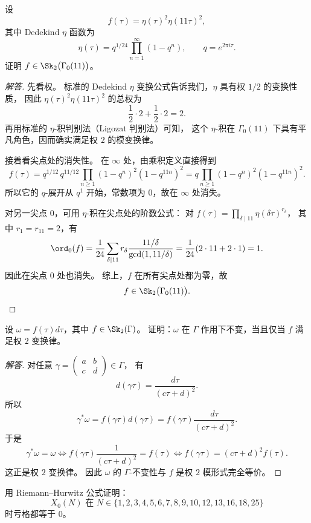 \begin{exercise}
\label{ex:ch02-eta-11}
设
\[
  f(\tau)=\eta(\tau)^2\eta(11\tau)^2,
\]
其中 Dedekind $\eta$ 函数为
\[
  \eta(\tau)=q^{1/24}\prod_{n=1}^{\infty}(1-q^n),
  \qquad q=e^{2\pi i\tau}.
\]
证明 $f\in \Sk_2\bigl(\Gamma_0(11)\bigr)$。
\end{exercise}

\begin{proof}[解答]
先看权。
标准的 Dedekind $\eta$ 变换公式告诉我们，$\eta$ 具有权 $1/2$ 的变换性质，
因此 $\eta(\tau)^2\eta(11\tau)^2$ 的总权为
\[
  \frac12\cdot 2+\frac12\cdot 2=2.
\]
再用标准的 $\eta$-积判别法（Ligozat 判别法）可知，
这个 $\eta$-积在 $\Gamma_0(11)$ 下具有平凡角色，因而确实满足权 $2$ 的模变换律。

接着看尖点处的消失性。
在 $\infty$ 处，由乘积定义直接得到
\[
  f(\tau)=q^{1/12}\,q^{11/12}\prod_{n\ge 1}(1-q^n)^2(1-q^{11n})^2
  =q\prod_{n\ge 1}(1-q^n)^2(1-q^{11n})^2.
\]
所以它的 $q$-展开从 $q^1$ 开始，常数项为 $0$，故在 $\infty$ 处消失。

对另一尖点 $0$，可用 $\eta$-积在尖点处的阶数公式：
对
$f(\tau)=\prod_{\delta\mid 11}\eta(\delta\tau)^{r_\delta}$，
其中 $r_1=r_{11}=2$，有
\[
  \ord_{0}(f)=\frac1{24}\sum_{\delta\mid 11} r_\delta\frac{11/\delta}{\gcd(1,11/\delta)}
  =\frac1{24}(2\cdot 11+2\cdot 1)=1.
\]
因此在尖点 $0$ 处也消失。
综上，$f$ 在所有尖点处都为零，故
\[
  f\in \Sk_2\bigl(\Gamma_0(11)\bigr).
\]
\end{proof}

\begin{exercise}
\label{ex:ch02-weight2-invariance}
设 $\omega=f(\tau)d\tau$，其中 $f\in \Sk_2(\Gamma)$。
证明：$\omega$ 在 $\Gamma$ 作用下不变，当且仅当 $f$ 满足权 $2$ 变换律。
\end{exercise}

\begin{proof}[解答]
对任意
$\gamma=\begin{pmatrix}a&b\\c&d\end{pmatrix}\in\Gamma$，
有
\[
  d(\gamma\tau)=\frac{d\tau}{(c\tau+d)^2}.
\]
所以
\[
  \gamma^*\omega=f(\gamma\tau)d(\gamma\tau)
  =f(\gamma\tau)\frac{d\tau}{(c\tau+d)^2}.
\]
于是
\[
  \gamma^*\omega=\omega
  \iff f(\gamma\tau)\frac{1}{(c\tau+d)^2}=f(\tau)
  \iff f(\gamma\tau)=(c\tau+d)^2f(\tau).
\]
这正是权 $2$ 变换律。
因此 $\omega$ 的 $\Gamma$-不变性与 $f$ 是权 $2$ 模形式完全等价。
\end{proof}

\begin{exercise}
\label{ex:ch02-genus-zero-list}
用 Riemann--Hurwitz 公式证明：
\[
  X_0(N) \text{ 在 } N\in\{1,2,3,4,5,6,7,8,9,10,12,13,16,18,25\}
\]
时亏格都等于 $0$。
\end{exercise}

